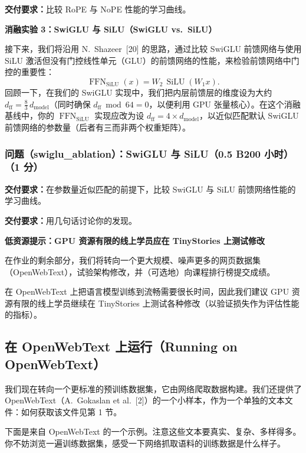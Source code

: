 \textbf{交付要求：}比较 RoPE 与 NoPE 性能的学习曲线。

\textbf{消融实验 3：SwiGLU 与 SiLU（SwiGLU vs.\ SiLU）}

接下来，我们将沿用 N.~Shazeer~[20] 的思路，通过比较 SwiGLU 前馈网络与使用 SiLU 激活但没有门控线性单元（GLU）的前馈网络的性能，来检验前馈网络中门控的重要性：
\begin{equation}
\operatorname{FFN}_{\operatorname{SiLU}}(x) = W_2\, \operatorname{SiLU}(W_1 x).
\tag{29}
\end{equation}
回顾一下，在我们的 SwiGLU 实现中，我们把内层前馈层的维度设为大约 $d_{\mathrm{ff}} = \tfrac{8}{3}\,d_{\mathrm{model}}$（同时确保 $d_{\mathrm{ff}} \bmod 64 = 0$，以便利用 GPU 张量核心）。在这个消融基线中，你的 $\operatorname{FFN}_{\operatorname{SiLU}}$ 实现应改为设 $d_{\mathrm{ff}} = 4 \times d_{\mathrm{model}}$，以近似匹配默认 SwiGLU 前馈网络的参数量（后者有三而非两个权重矩阵）。

\subsubsection*{问题（swiglu\_ablation）：SwiGLU 与 SiLU（0.5 B200 小时）（1 分）}

\textbf{交付要求：}在参数量近似匹配的前提下，比较 SwiGLU 与 SiLU 前馈网络性能的学习曲线。

\textbf{交付要求：}用几句话讨论你的发现。

\textbf{低资源提示：GPU 资源有限的线上学员应在 TinyStories 上测试修改}

在作业的剩余部分，我们将转向一个更大规模、噪声更多的网页数据集（OpenWebText），试验架构修改，并（可选地）向课程排行榜提交成绩。

在 OpenWebText 上把语言模型训练到流畅需要很长时间，因此我们建议 GPU 资源有限的线上学员继续在 TinyStories 上测试各种修改（以验证损失作为评估性能的指标）。

\subsection{在 OpenWebText 上运行（Running on OpenWebText）}

我们现在转向一个更标准的预训练数据集，它由网络爬取数据构建。我们还提供了 OpenWebText（A.~Gokaslan et al.~[2]）的一个小样本，作为一个单独的文本文件：如何获取该文件见第 1 节。

下面是来自 OpenWebText 的一个示例。注意这些文本要真实、复杂、多样得多。你不妨浏览一遍训练数据集，感受一下网络抓取语料的训练数据是什么样子。

